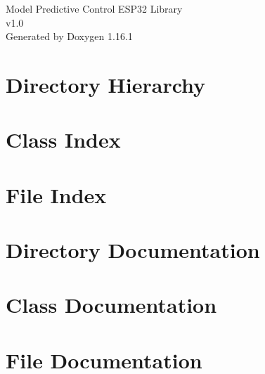 \documentclass[twoside]{book}
\newcommand{\+}{\discretionary{\mbox{\scriptsize$\hookleftarrow$}}{}{}}
\newcommand{\clearemptydoublepage}{%
    \newpage{\pagestyle{empty}\cleardoublepage}%
  }
\begin{document}
  \raggedbottom
    \hypersetup{pageanchor=false,
                bookmarksnumbered=true,
                pdfencoding=unicode
               }
  \begin{titlepage}
  \vspace*{7cm}
  \begin{center}%
  {\Large Model Predictive Control ESP32 Library}\\
  [1ex]\large v1.\+0 \\
  \vspace*{1cm}
  {\large Generated by Doxygen 1.16.1}\\
  \end{center}
  \end{titlepage}
  \clearemptydoublepage
  \tableofcontents
  \clearemptydoublepage
  \hypersetup{pageanchor=true}
\chapter{Directory Hierarchy}

\chapter{Class Index}

\chapter{File Index}

\chapter{Directory Documentation}



\chapter{Class Documentation}


\chapter{File Documentation}






  \backmatter
  \newpage
  \clearemptydoublepage
  \printindex
\end{document}
